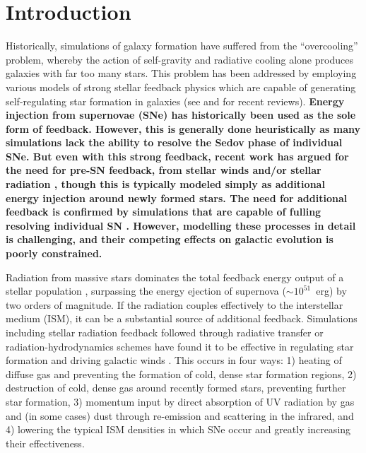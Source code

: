 \documentclass[twocolumn]{aastex62}
\begin{document}

\section{Introduction} \label{sec:intro}
Historically, simulations of galaxy formation have suffered from the ``overcooling'' problem, whereby the action of self-gravity and radiative cooling alone produces galaxies with far too many stars. This problem has been addressed by employing various models of strong stellar feedback physics which are capable of generating self-regulating star formation in galaxies (see \cite{SomervilleDave2015} and \cite{NaabOstriker2017} for recent reviews). \textbf{Energy injection from supernovae (SNe) has historically been used as the sole form of feedback. However, this is generally done heuristically as many simulations lack the ability to resolve the Sedov phase of individual SNe. But even with this strong feedback, recent work has argued for the need for pre-SN feedback, from stellar winds and/or stellar radiation \citep[e.g.][]{Hu2016,Hopkins2018}, though this is typically modeled simply as additional energy injection around newly formed stars. The need for additional feedback is confirmed by simulations that are capable of fulling resolving individual SN \citep[e.g.]{Hu2017,Peters2017}. However, modelling these processes in detail is challenging, and their competing effects on galactic evolution is poorly constrained.}

Radiation from massive stars dominates the total feedback energy output of a stellar population \citep[e.g.][]{Abbott1982,Leitherer1999,Agertz2013}, surpassing the energy ejection of supernova ($\sim 10^{51}$~erg) by two orders of magnitude. If the radiation couples effectively to the interstellar medium (ISM), it can be a substantial source of additional feedback. Simulations including stellar radiation feedback followed through radiative transfer or radiation-hydrodynamics schemes have found it to be effective in regulating star formation and driving galactic winds \citep[e.g.][]{WiseAbel2012,Kim2013a,Sales2014,Oshea2015,Rosdahl2015,Ocvirk2015,Pawlik2015,Peters2017}. This occurs in four ways: 1) heating of diffuse gas and preventing the formation of cold, dense star formation regions, 2) destruction of cold, dense gas around recently formed stars, preventing further star formation, 3) momentum input by direct absorption of UV radiation by gas and (in some cases) dust through re-emission and scattering in the infrared, and 4) lowering the typical ISM densities in which SNe occur and greatly increasing their effectiveness. %
\end{document}
